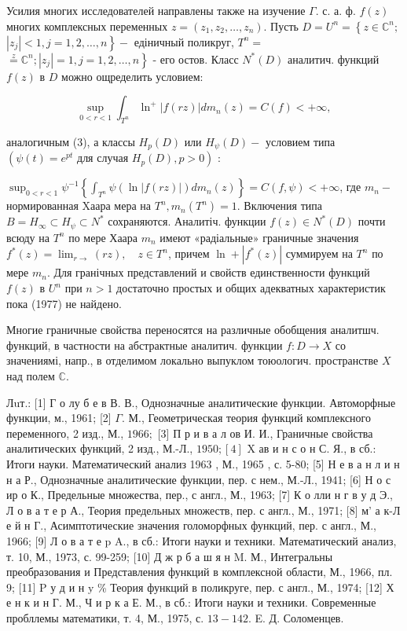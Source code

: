 \documentclass[10pt]{article}
\begin{document}
Усилия многих исследователей направлены также на изучение $\Gamma$. с. а. ф. $f(z)$ многих комплексных переменных $z=\left(z_{1}, z_{2}, \ldots, z_{n}\right)$. Пусть $D=U^{n}=\left\{z \in \mathbb{C}^{n} ;\right.$ $\left.\left|z_{j}\right|<1, j=1,2, \ldots, n\right\}-$ едіничный поликруг, $T^{n}=$ $\left.\stackrel{z}{=} \mathbb{C}^{n} ;\left|z_{j}\right|=1, j=1,2, \ldots, n\right\}$ - его остов. Класс $N^{*}(D)$ аналитич. функций $f(z)$ в $D$ можно ощределить условием:



\[

\sup _{0<r<1} \int_{T^{n}} \ln ^{+}|f(r z)| d m_{n}(z)=C(f)<+\infty,

\]



аналогичным (3), а классы $H_{p}(D)$ или $H_{\psi}(D)-$ условием типа $\left(\psi(t)=e^{p t}\right.$ для случая $\left.H_{p}(D), p>0\right)$ :



$\sup _{0<r<1} \psi^{-1}\left\{\int_{T^{n}} \psi(\ln |f(r z)|) d m_{n}(z)\right\}=C(f, \psi)<+\infty$, где $m_{n}-$ нормированная Xаара мера на $T^{n}, m_{n}\left(T^{n}\right)=1$. Включения типа $B=H_{\infty} \subset H_{\psi} \subset N^{*}$ сохраняются. Аналитіч. функции $f(z) \in N^{*}(D)$ почти всюду на $T^{n}$ по мере Хаара $m_{n}$ имеют «радіальные» граничные значения $f^{*}(z)=\lim _{r \rightarrow}(r z), \quad z \in T^{n}$, причем $\ln +\left|f^{*}(z)\right|$ суммируем на $T^{n}$ по мере $m_{n}$. Для гранічных представлений и свойств единственности функций $f(z)$ в $U^{n}$ при $n>1$ достаточно простых и общих адекватных характеристик пока (1977) не найдено.



Многие граничные свойства переносятся на различные обобщения аналитшч. функций, в частности на абстрактные аналитич. функции $f: D \rightarrow X$ со значениямі, напр., в отделимом локально выпуклом тоюологич. пространстве $X$ над полем $\mathbb{C}$.



Лuт.: [1] Г о лу б е в В. В., Однозначные аналитические функции. Автоморфные функции, м., 1961; [2] $\Gamma$. М., Геометрическая теория функций комплексного переменного, 2 изд., М., $1966 ;$ [3] П р и в а л ов И. И., Граничные свойства аналитических функций, 2 изд., М.-Л., $1950 ;[4]$ X ав и н с о н С. Я., в сб.: Итоги науки. Математический анализ 1963 , М., 1965 , с. 5-80; [5] Н е в а н л и н н а Р., Однозначные аналитические функции, пер. с нем., М.-Л., 1941; [6] Н о с ир о К., Предельные множества, пер., с англ., М., 1963; [7] К о лли н г в у д Э., Л о в а т е р А., Теория предельных множеств, пер. с англ., М., 1971; [8] м' а к-Л е й н Г., Асимптотические значения голоморфных функций, пер. с англ., М., 1966; [9] Л о в а т е p A., в сб.: Итоги науки и техники. Математический анализ, т. 10, М., 1973, с. 99-259; [10] Д ж р б а ш я н M. М., Интегральны преобразования и Представления функций в комплексной области, М., 1966, пл. 9; [11] P у д и н $\mathrm{y}$ \% Теория функций в поликруге, пер. с англ., М., 1974; [12] Х е н к и н Г. М., Ч и р к а Е. М., в сб.: Итоги науки и техники. Современные пробллемы математики, т. 4, М., 1975, с. $13-142$. E. Д. Соломенцев.
\end{document}
